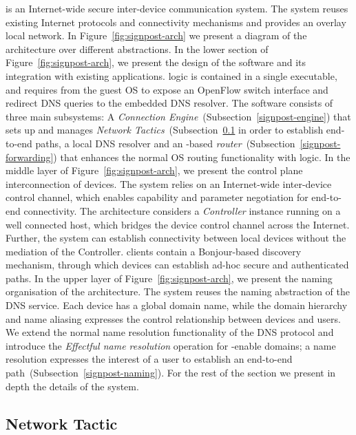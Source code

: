 \signpost is an Internet-wide secure inter-device communication system. The
system reuses existing Internet protocols and connectivity mechanisms and
provides an overlay local network. In Figure~\ref{fig:signpost-arch} we present
a diagram of the \signpost architecture over different abstractions. 
In the lower section of Figure~\ref{fig:signpost-arch}, we present the design of
the \signpost software and its integration with existing applications.
\signpost logic is contained in a single executable, and requires from the guest
OS to expose an OpenFlow switch interface and redirect DNS queries to the
embedded DNS resolver.  The software consists of three main subsystems: A
{\it Connection Engine}~(Subsection~\ref{signpost-engine}) that sets up and
manages {\it Network Tactics}~(Subsection~\ref{signpost-tactic} in order to establish
end-to-end paths, a local DNS resolver and an \of-based {\it \signpost
  router}~(Subsection~\ref{signpost-forwarding}) that enhances the normal OS
routing functionality with \signpost logic.  
In the middle layer of Figure~\ref{fig:signpost-arch}, we present the control
plane interconnection of \signpost devices. The system relies on an
Internet-wide inter-device control channel, which enables capability and
parameter negotiation for end-to-end connectivity. The architecture considers a
\emph{Controller \signpost} instance running on a well connected host, which
bridges the device control channel across the Internet.  Further, the system can
establish connectivity between local devices without the mediation of the
\signpost Controller.  \signpost clients contain a Bonjour-based discovery
mechanism, through which devices can establish ad-hoc secure and authenticated
paths.
In the upper layer of Figure~\ref{fig:signpost-arch}, we present the naming
organisation of the \signpost architecture. The system reuses the naming
abstraction of the DNS service. Each device has a global domain name, while the
domain hierarchy and name aliasing expresses the control relationship between
devices and users.  We extend the normal name resolution functionality of the
DNS protocol and introduce the  {\it Effectful name resolution} operation for
\signpost-enable domains; a name resolution expresses the interest of a user to
establish an end-to-end path~(Subsection~\ref{signpost-naming}). For the rest of
the section we present in depth the details of the \signpost system. 

\subsection{Network Tactic} \label{signpost-tactic}

